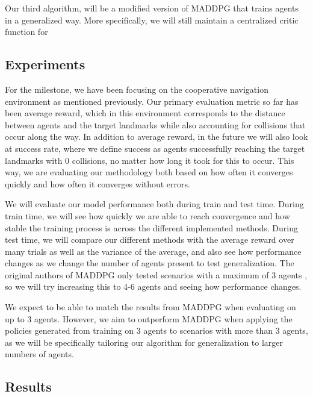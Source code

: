 \documentclass{article}
\begin{document}
Our third algorithm, will be a modified version of MADDPG that trains agents in a generalized way. More specifically, we will still maintain a centralized critic function for

\subsection{Experiments}

For the milestone, we have been focusing on the cooperative navigation environment as mentioned previously. Our primary evaluation metric so far has been average reward, which in this environment corresponds to the distance between agents and the target landmarks while also accounting for collisions that occur along the way. In addition to average reward, in the future we will also look at success rate, where we define success as agents successfully reaching the target landmarks with 0 collisions, no matter how long it took for this to occur. This way, we are evaluating our methodology both based on how often it converges quickly and how often it converges without errors.

We will evaluate our model performance both during train and test time. During train time, we will see how quickly we are able to reach convergence and how stable the training process is across the different implemented methods. During test time, we will compare our different methods with the average reward over many trials as well as the variance of the average, and also see how performance changes as we change the number of agents present to test generalization. The original authors of MADDPG only tested scenarios with a maximum of 3 agents , so we will try increasing this to 4-6 agents and seeing how performance changes.

We expect to be able to match the results from MADDPG when evaluating on up to 3 agents. However, we aim to outperform MADDPG when applying the policies generated from training on 3 agents to scenarios with more than 3 agents, as we will be specifically tailoring our algorithm for generalization to larger numbers of agents.

\subsection{Results}
\end{document}
